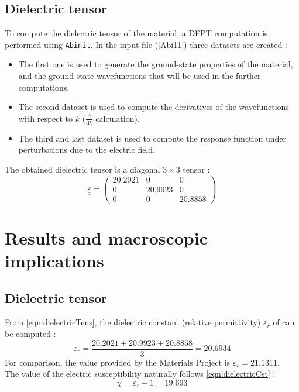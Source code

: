 \documentclass[11pt,a4paper]{article}
\begin{document}
\subsection{Dielectric tensor}
To compute the dielectric tensor of the material, a DFPT computation is performed using \texttt{Abinit}. In the input file (\autoref{Abi11}) three datasets are created : 
\begin{itemize}
\item The first one is used to generate the ground-state properties of the material, and the ground-state wavefunctions that will be used in the further computations.
\item The second dataset is used to compute the derivatives of the wavefunctions with respect to $k$ ($\frac{\text{d}}{\text{d}k}$ calculation).  
\item The third and last dataset is used to compute the response function under perturbations due to the electric field.
\end{itemize}
The obtained dielectric tensor is a diagonal $3\times 3$ tensor : 
\begin{equation}
\label{eqn:dielectricTens}\underline{\underline{\varepsilon}} = \left(\begin{array}{ccc}20.2021&0&0\\0&20.9923&0\\0&0&20.8858\end{array}\right)\end{equation}
\section{Results and macroscopic implications}
\subsection{Dielectric tensor}
From \autoref{eqn:dielectricTens}, the dielectric constant (relative permittivity) $\varepsilon_{r}$ of  can be computed :  
\begin{equation}
\label{eqn:dielectricCst}
\varepsilon_{r} = \dfrac{20.2021+20.9923+20.8858}{3} = 20.6934
\end{equation}
For comparison, the value provided by the Materials Project is $\varepsilon_r = 21.1311$. \\
The value of the electric susceptibility naturally follows \autoref{eqn:dielectricCst} : 
\begin{equation}
\label{eqn:electricSusc}
\chi = \varepsilon_r-1 = 19.693
\end{equation}
\end{document}
